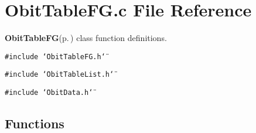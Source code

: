 \section{Obit\-Table\-FG.c File Reference}
\label{ObitTableFG_8c}
{\bf Obit\-Table\-FG}{\rm (p.\,\pageref{structObitTableFG})} class function definitions. 

{\tt \#include \char`\"{}Obit\-Table\-FG.h\char`\"{}}\par
{\tt \#include \char`\"{}Obit\-Table\-List.h\char`\"{}}\par
{\tt \#include \char`\"{}Obit\-Data.h\char`\"{}}\par
\subsection*{Functions}
